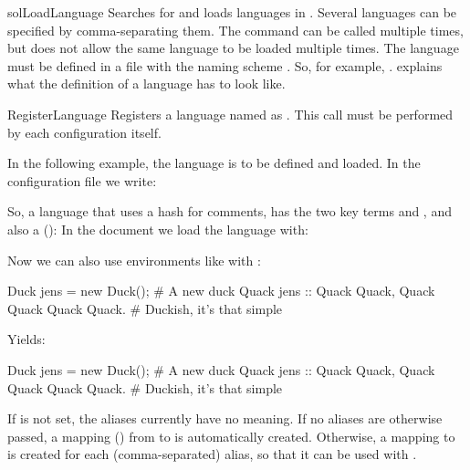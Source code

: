 \documentclass{sopra-base}
\begin{document}
\begin{command}{solLoadLanguage}{}
    Searches for and loads languages in . Several languages can be specified by comma-separating them. The command can be called multiple times, but does not allow the same language to be loaded multiple times. The language must be defined in a file with the naming scheme . So, for example, .  explains what the definition of a language has to look like. 
\end{command}

\begin{command}{RegisterLanguage}{}
    Registers a language named  as . This call must be performed by each configuration itself. \par{}
    In the following example, the language  is to be defined and loaded. In the configuration file we write:
\begin{latex}
\end{latex}
    So, a language that uses a hash for comments, has the two key terms  and , and also a  (): 
    In the document we load the language with:
\begin{latex}
\end{latex}
    Now we can also use environments like  with :
\begin{latex}[morekeywords={[3]{rubberduck}}]
\begin{rubberduck}
Duck jens = new Duck(); # A new duck
Quack jens ::{
    Quack Quack, Quack Quack
    Quack Quack. # Duckish, it's that simple
}
\end{rubberduck}
\end{latex}
Yields:
\begin{rubberduck}
Duck jens = new Duck(); # A new duck
Quack jens ::{
    Quack Quack, Quack Quack
    Quack Quack. # Duckish, it's that simple
}
\end{rubberduck}

    If  is not set, the aliases currently have no meaning.
    If no aliases are otherwise passed, a mapping () from  to  is automatically created. Otherwise, a mapping to  is created for each (comma-separated) alias, so that it can be used with .
\end{command}
\end{document}
